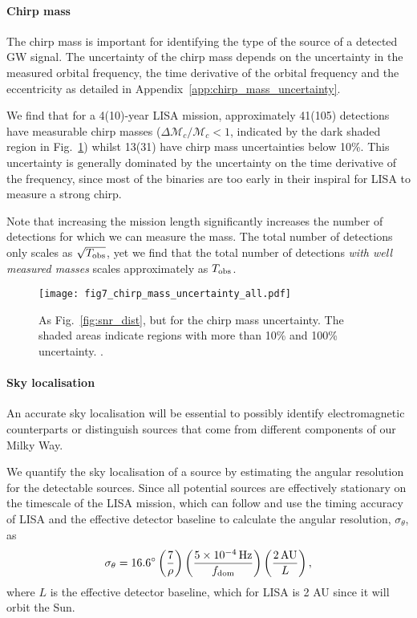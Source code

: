 \paragraph{Chirp mass}

The chirp mass is important for identifying the type of the source of a detected GW signal. The uncertainty of the chirp mass depends on the uncertainty in the measured orbital frequency, the time derivative of the orbital frequency and the eccentricity as detailed in Appendix~\ref{app:chirp_mass_uncertainty}.

We find that for a 4(10)-year LISA mission, approximately 41(105) detections have measurable chirp masses ($\Delta \mathcal{M}_c / \mathcal{M}_c < 1$, indicated by the dark shaded region in Fig.~\ref{fig:m_c_unc}) whilst 13(31) have chirp mass uncertainties below 10\%. This uncertainty is generally dominated by the uncertainty on the time derivative of the frequency, since most of the binaries are too early in their inspiral for LISA to measure a strong chirp.

Note that increasing the mission length significantly increases the number of detections for which we can measure the mass. The total number of detections only scales as $\sqrt{T_{\rm obs}}$, yet we find that the total number of detections \textit{with well measured masses} scales approximately as $T_{\rm obs}$.

\begin{figure}[tb]
    \centering
    \texttt{[image: fig7\_chirp\_mass\_uncertainty\_all.pdf]}
    \caption{As Fig.~\ref{fig:snr_dist}, but for the chirp mass uncertainty. The shaded areas indicate regions with more than 10\% and 100\% uncertainty. \href{https://github.com/TomWagg/detecting-DCOs-in-LISA/blob/main/paper/figures/fig7_chirp_mass_uncertainty_all.pdf}{\faFileImage} \href{https://github.com/TomWagg/detecting-DCOs-in-LISA/blob/main/paper/figure_notebooks/fiducial.ipynb}{\faBook}.}
    \label{fig:m_c_unc}
\end{figure}

\paragraph{Sky localisation}

An accurate sky localisation will be essential to possibly identify electromagnetic counterparts or distinguish sources that come from different components of our Milky Way. 

We quantify the sky localisation of a source by estimating the angular resolution for the detectable sources. Since all potential sources are effectively stationary on the timescale of the LISA mission, which can follow \citet{Mandel+2018} and use the timing accuracy of LISA and the effective detector baseline to calculate the angular resolution, $\sigma_{\theta}$, as
\begin{equation}
    \sigma_{\theta} = 16.6^\circ \left(\frac{7}{\rho}\right) \left(\frac{5 \times 10^{-4} \unit{Hz}}{f_{\rm dom}}\right) \left( \frac{2 \unit{AU}}{L} \right),
\end{equation}
where $L$ is the effective detector baseline, which for LISA is 2 AU since it will orbit the Sun.

